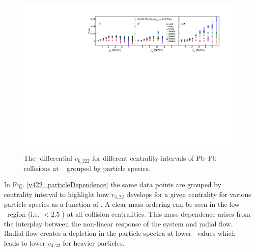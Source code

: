 \begin{figure}[!htb]
\begin{center}
\includegraphics[scale=0.82]{figures/results/All_v6222_gap00_CentDep_PID2.pdf}
\end{center}
\caption{The \pT-differential $v_{6,222}$ for different centrality intervals of Pb--Pb collisions at \sNN~ grouped by particle species.}
\label{v6222_centralityDependence}
\end{figure}

\newpage

In Fig. \ref{v422_particleDependence} the same data points are grouped by centrality interval to highlight how $v_{4,22}$ develops for a given centrality for various particle species as a function of \pT.
A clear mass ordering can be seen in the low \pT~region (i.e. \pT $< 2.5$ \GeV) at all collision centralities. This mass dependence arises from the interplay between the non-linear response of the system and radial flow. Radial flow creates a depletion in the particle spectra at lower \pT~values which leads to lower $v_{4,22}$ for heavier particles.


